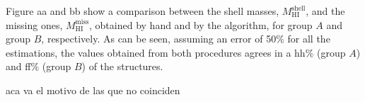\documentclass{aa}
\begin{document}
Figure aa and bb show a comparison between the shell masses, $M_{\mathrm{HI}}^{\mathrm{shell}}$,  and    the missing ones, $M_{\mathrm{HI}}^{\mathrm{miss}}$, obtained by hand and by the algorithm, for group $A$ and group $B$, respectively.
As can be seen, assuming an error of 50\% for all the estimations, the values obtained from both procedures agrees in a hh\% (group $A$) and ff\% (group $B$) of the structures.

aca va el motivo de las que no coinciden




 



\end{document}

